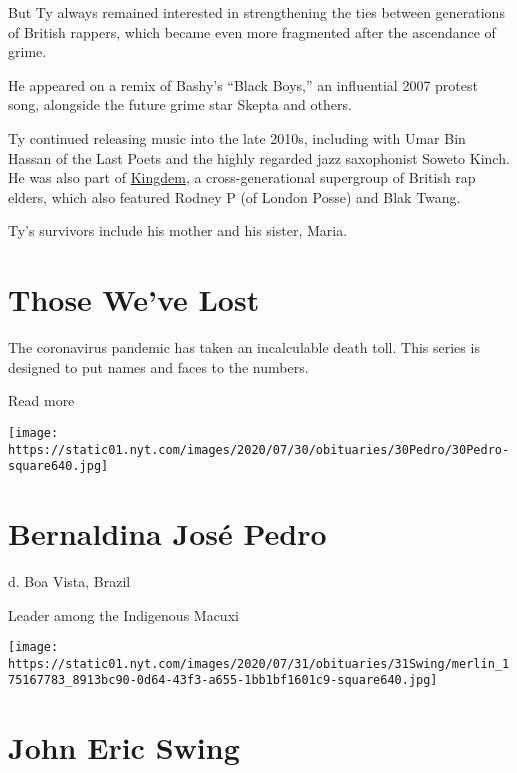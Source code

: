 But Ty always remained interested in strengthening the ties between
generations of British rappers, which became even more fragmented after
the ascendance of grime.

He appeared on a remix of Bashy's ``Black Boys,'' an influential 2007
protest song, alongside the future grime star Skepta and others.

Ty continued releasing music into the late 2010s, including with Umar
Bin Hassan of the Last Poets and the highly regarded jazz saxophonist
Soweto Kinch. He was also part of
\href{https://kingdemrodneyptyandblaktwang.bandcamp.com/album/the-kingdem-ep}{Kingdem},
a cross-generational supergroup of British rap elders, which also
featured Rodney P (of London Posse) and Blak Twang.

Ty's survivors include his mother and his sister, Maria.

\href{https://www.nytimes.com/interactive/2020/obituaries/people-died-coronavirus-obituaries.html?action=click\&pgtype=Article\&state=default\&region=BELOW_MAIN_CONTENT\&context=covid_obits_promo}{}

\hypertarget{those-weve-lost}{%
\section{Those We've Lost}\label{those-weve-lost}}

The coronavirus pandemic has taken an incalculable death toll. This
series is designed to put names and faces to the numbers.

Read more

\texttt{[image: https://static01.nyt.com/images/2020/07/30/obituaries/30Pedro/30Pedro-square640.jpg]}

\hypertarget{bernaldina-josuxe9-pedro}{%
\section{Bernaldina José Pedro}\label{bernaldina-josuxe9-pedro}}

d. Boa Vista, Brazil

Leader among the Indigenous Macuxi

\texttt{[image: https://static01.nyt.com/images/2020/07/31/obituaries/31Swing/merlin\_175167783\_8913bc90-0d64-43f3-a655-1bb1bf1601c9-square640.jpg]}

\hypertarget{john-eric-swing}{%
\section{John Eric Swing}\label{john-eric-swing}}

